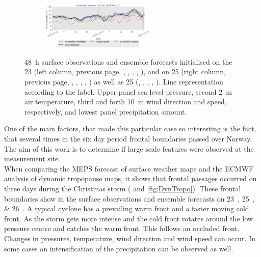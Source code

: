 \begin{figure}
    \begin{subfigure}[b]{\textwidth}
    	\centering
 		\includegraphics[trim={5.5cm 0cm 5.cm 17.2cm},clip,
    width=0.6\textwidth]{./fig_sfc_ws/20161225_00}
    \end{subfigure}
    \caption{\SI{48}{\hour} surface observations and ensemble forecasts initialised on the \SI{23}{\dec} (left column, previous page, \protect{}, \protect{}, \protect{}, \protect{}, \protect{}), and on \SI{25}{\dec} (right column, previous page, \protect{}, \protect{}, \protect{}, \protect{}, \protect{}) as well as \SI{25}{\dec} (\protect{}, \protect{}, \protect{}, \protect{}, \protect{}). Line representation according to the label. Upper panel sea level pressure, second \SI{2}{\metre} air temperature, third and forth \SI{10}{\metre} wind direction and speed, respectively, and lowest panel precipitation amount. }\label{fig:res:sfc_obs_meps}
\end{figure}
One of the main factors, that made this particular case so interesting is the fact, that several times in the six day period frontal boundaries passed over Norway. The aim of this work is to determine if large scale features were observed at the measurement site. 
\\
When comparing the MEPS forecast of surface weather maps and the ECMWF analysis of dynamic tropopause maps, it shows that frontal passages occurred on three days during the Christmas storm ( and \ref{fig:DynTropo}).  These frontal boundaries show in the surface observations and ensemble forecasts on \SIlist{23;25;26}{\dec}. A typical cyclone has a prevailing warm front and a faster moving cold front. As the storm gets more intense and the cold front rotates around the low pressure centre and catches the warm front. This follows an occluded front. Changes in pressures, temperature, wind direction and wind speed can occur. In some cases an intensification of the precipitation can be observed as well.
